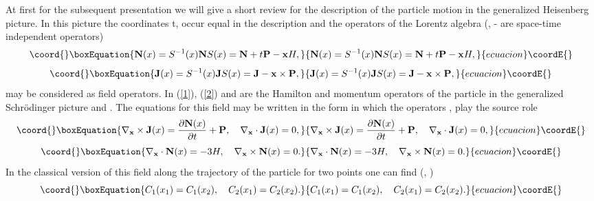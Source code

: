 \documentclass[a4paper,12pt]{article}
\begin{document}
At first for the subsequent presentation we will give a short review for the description of the particle motion   in  the generalized Heisenberg  picture. In this picture   the coordinates t, \coordHE{} occur equal in the description and the operators of the Lorentz algebra  (\coordHE{}, \coordHE{} - are  space-time independent operators)
\begin{equation}\coord{}\boxEquation{
\label{1}
{\bf N}(x)=S^{-1}(x){\bf N}S(x)={\bf N}+t{\bf P}-{\bf x}{H},
}{
{\bf N}(x)=S^{-1}(x){\bf N}S(x)={\bf N}+t{\bf P}-{\bf x}{H},
}{ecuacion}\coordE{}\end{equation} 
\begin{equation}\coord{}\boxEquation{
\label{2}
{\bf J}(x)=S^{-1}(x){\bf J}S(x)={\bf J}-{\bf x}\times{\bf P},
}{
{\bf J}(x)=S^{-1}(x){\bf J}S(x)={\bf J}-{\bf x}\times{\bf P},
}{ecuacion}\coordE{}\end{equation}
may be  considered as field  operators. In (\ref{1}), (\ref{2}) \coordHE{} and \coordHE{} are the  Hamilton and momentum operators of the particle in the generalized Schr\"odinger  picture and \coordHE{}.   The  equations for this field may be written in the form in which the  operators \coordHE{},  \coordHE{}  play the source role 
\begin{equation}\coord{}\boxEquation{
\label{3} 
{\bf \nabla}_{\bf x}\times{\bf J}(x)=\frac{\partial{\bf N}
(x)}{\partial{t}}+{\bf P},\quad{\bf \nabla}_{\bf x}\cdot{\bf J}(x)=0,
}{
{\bf \nabla}_{\bf x}\times{\bf J}(x)=\frac{\partial{\bf N}
(x)}{\partial{t}}+{\bf P},\quad{\bf \nabla}_{\bf x}\cdot{\bf J}(x)=0,
}{ecuacion}\coordE{}\end{equation}
\begin{equation}\coord{}\boxEquation{
\label{4} 
{\bf \nabla}_{\bf x}\cdot{\bf N}(x)=-3H,\quad{\bf \nabla}_{\bf x}\times{\bf N}(x)=0.
}{
{\bf \nabla}_{\bf x}\cdot{\bf N}(x)=-3H,\quad{\bf \nabla}_{\bf x}\times{\bf N}(x)=0.
}{ecuacion}\coordE{}\end{equation}
In the classical version of this  field along  the trajectory  of the particle \coordHE{} for two points  one can find (\coordHE{}, \coordHE{})  
\begin{equation}\coord{}\boxEquation{
\label{5} 
{C_1(x_1)}={C_1(x_2)},\quad{C_2}(x_1)={C_2(x_2)}.
}{
{C_1(x_1)}={C_1(x_2)},\quad{C_2}(x_1)={C_2(x_2)}.
}{ecuacion}\coordE{}\end{equation}
\end{document}
